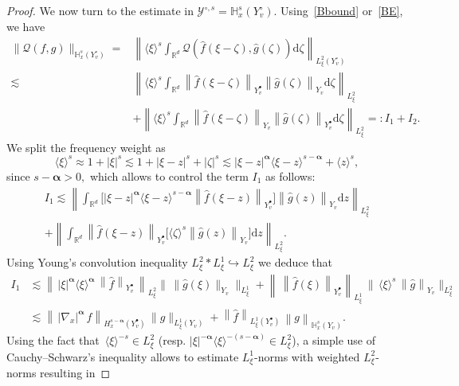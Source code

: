 \documentclass[10pt]{amsart}
\theoremstyle{definition}\newtheorem{defi}[theo]{Definition}\newtheorem{rema}[theo]{Remark}\newtheorem{exam}[theo]{Example}\newtheorem{exem}[theo]{Example}\newtheorem{nota}[theo]{Notation}
\renewcommand{\d}{\mathrm{d}}
\newcommand{\R}{\mathbb{R}}
\newcommand{\bbH}{\mathbb{H}}
\newcommand{\QQ}{\mathcal{Q}}
\newcommand{\VV}{\mathcal{Y}}
\newcommand{\Sg}{Y}
\newcommand{\Sgp}{Y^{\bullet}}
\newcommand{\Sgm}{Y^{\circ}}
\newcommand{\rSSgm}[1]{\VV^{\circ, #1}}
\newcommand{\la}{\langle}
\newcommand{\ra}{\rangle}
\begin{document}
\begin{proof}
We now turn to the estimate in $\rSSgm{s} = \bbH^s_x (\Sgm_v)$. Using~\eqref{Bbound} or~\eqref{BE}, we have
\begin{align*}
\| \QQ(f, g) \|_{ \bbH^s_x \left(\Sgm_v \right) } = & \left\| \la \xi \ra^s \int_{\R^{d}} \QQ\left(\widehat{f}(\xi - \zeta), \widehat{g}(\zeta) \right) \d \zeta \right\|_{ L^2_\xi \left(\Sgm_v \right) } \\
\lesssim & \left\| \la \xi \ra^s \int_{\R^{d}} \left\| \widehat{f}(\xi - \zeta) \right\|_{ \Sgp_v } \left\| \widehat{g}(\zeta)  \right\|_{ \Sg_v } \d \zeta \right\|_{ L^2_\xi } \\
& + \left\| \la \xi \ra^s \int_{\R^{d}} \left\| \widehat{f}(\xi - \zeta) \right\|_{ \Sg_v } \left\| \widehat{g}(\zeta) \right\|_{ \Sgp_v } \d \zeta \right\|_{ L^2_\xi } =: I_1 + I_2.
\end{align*}
We split the frequency weight as
\[
\la \xi \ra^s \approx 1 + | \xi |^s \lesssim 1 + | \xi - z |^s + | \zeta |^s \lesssim | \xi - z|^{\boldsymbol{\alpha}} \la \xi - z \ra^{s - \boldsymbol{\alpha}} + \la z\ra^s,
\]
since $s-\boldsymbol{\alpha} >0,$ which allows to control the term $I_1$ as follows:
\begin{multline*}
I_1 \lesssim \left\| \int_{\R^{d}} \Big[| \xi - z |^{\boldsymbol{\alpha}} \la \xi - z \ra^{s - \boldsymbol{\alpha}} \left\| \widehat{f}(\xi -z)\right\|_{ \Sgp_v } \Big] \left\| \widehat{g}(z) \right\|_{ \Sg_v } \d z \right\|_{ L^2_\xi } \\
+ \left\| \int_{\R^{d}} \left\| \widehat{f}(\xi -z) \right\|_{ \Sgp_v } \Big[\la \zeta \ra^s \left\| \widehat{g}(z) \right\|_{ \Sg_v }\Big] \d z \right\|_{ L^2_\xi }.
\end{multline*}
Using Young's convolution inequality $L^2_\xi \ast L^1_\xi \hookrightarrow L^2_\xi$ we deduce that
\begin{align*}
I_1 &\lesssim \left\|\,|\xi|^{\boldsymbol{\alpha}}\langle\xi\rangle^{\boldsymbol{\alpha}}\,
\left\|\widehat{f}\right\|_{\Sgp_v}\,\right\|_{L^2_\xi}
\big\|\,\|\widehat{g}(\xi)\|_{\Sg_v}\big\|_{L^1_\xi}+
\left\|\,\left\|\widehat{f}(\xi)\right\|_{\Sgp_v}\right\|_{L^1_\xi}\,\big\|\,\langle\xi\rangle^{s}\,\left\|\widehat{g}\right\|_{\Sg_v}\big\|_{L^2_\xi}\\
&\lesssim \left\|\,|\nabla_x|^{\boldsymbol{\alpha}}\,f\right\|_{H^{s-\boldsymbol{\alpha}}_x(\Sgp_v)}\,\|\widehat{g}\|_{L^1_\xi(\Sg_v)}+\left\|\widehat{f}\right\|_{L^1_\xi(\Sgp_v)}\,\left\|g\right\|_{\bbH^s_x(\Sg_v)}.
\end{align*}
Using the fact that~$\la \xi \ra^{ -s } \in L^2_\xi$ (resp. $| \xi |^{ -\boldsymbol{\alpha} } \la \xi \ra^{-(s - \boldsymbol{\alpha}) } \in L^2_\xi$), a simple use of Cauchy--Schwarz's inequality allows to estimate $L^1_\xi$-norms with weighted $L^2_\xi$-norms resulting in

\end{proof}
\end{document}
